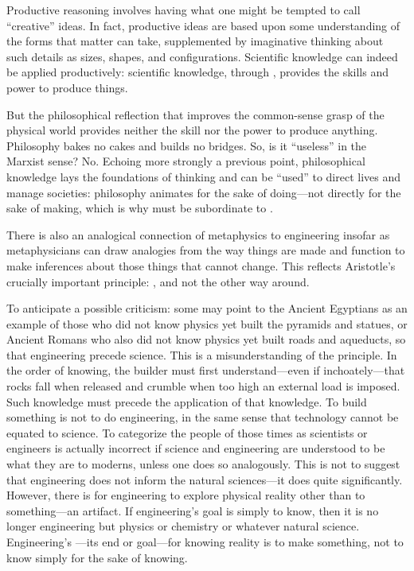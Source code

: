 Productive reasoning involves having what one might be tempted to call ``creative'' ideas. In fact, productive ideas are based upon some understanding of the forms that matter can take, supplemented by imaginative thinking about such details as sizes, shapes, and configurations. Scientific knowledge can indeed be applied productively: scientific knowledge, through , provides the skills and power to produce things.

But the philosophical reflection that improves the common-sense grasp of the physical world provides neither the skill nor the power to produce anything. Philosophy bakes no cakes and builds no bridges. So, is it ``useless'' in the Marxist sense? No. Echoing more strongly a previous point, philosophical knowledge lays the foundations of thinking and can be ``used'' to direct lives and manage societies: philosophy animates for the sake of doing---not directly for the sake of making, which is why  must be subordinate to .

There is also an analogical connection of metaphysics to engineering insofar as metaphysicians can draw analogies from the way things are made and function to make inferences about those things that cannot change. This reflects Aristotle's crucially important principle: , and not the other way around.

To anticipate a possible criticism: some may point to the Ancient Egyptians as an example of those who did not know physics yet built the pyramids and statues, or Ancient Romans who also did not know physics yet built roads and aqueducts, so that engineering  precede science. This is a misunderstanding of the principle. In the order of knowing, the builder must first understand---even if inchoately---that rocks fall when released and crumble when too high an external load is imposed. Such knowledge must precede the application of that knowledge. To build something is not to do engineering, in the same sense that technology cannot be equated to science. To categorize the people of those times as scientists or engineers is actually incorrect if science and engineering are understood to be what they are to moderns, unless one does so analogously. This is not to suggest that engineering does not inform the natural sciences---it does quite significantly. However, there is  for engineering to explore physical reality other than to  something---an artifact. If engineering's goal is simply to know, then it is no longer engineering but physics or chemistry or whatever natural science. Engineering's ---its end or goal---for knowing reality is to make something, not to know simply for the sake of knowing.

